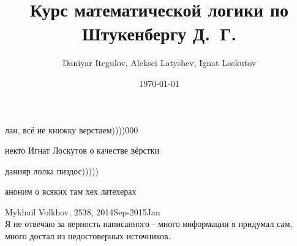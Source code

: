 \documentclass[fleqn,12pt]{article}
\author{Daniyar Itegulov, Aleksei Latyshev, Ignat Loskutov}
\date{\today}
\title{Курс математической логики по Штукенбергу Д.~Г.}
\newcommand{\+}{\lambda}
\begin{document}
\theoremstyle{definition}
\newtheorem*{definition}{Определение}%
\newtheorem*{example}{Пример}
\newtheorem{theorem}{Теорема}[section]
\newtheorem{axiom}{Аксиома}[section]
\newtheorem{lemma}[theorem]{Лемма}

\maketitle
\tableofcontents

\epigraph{%
    лан, всё не книжку верстаем))))000}
  {некто Игнат Лоскутов о качестве вёрстки}  
\epigraph{%
    данияр лолка пиздос)))))}
  {аноним о всяких там хех латехерах}

Mykhail Volkhov, 2538, 2014Sep-2015Jan\\
Я не отвечаю за верность написанного - много информации
я придумал сам, много достал из недостоверных источников.
\renewcommand{\thesection}{\Roman{section}}


\setcounter{section}{0}
\renewcommand{\thesection}{\arabic{section}}









\end{document}
